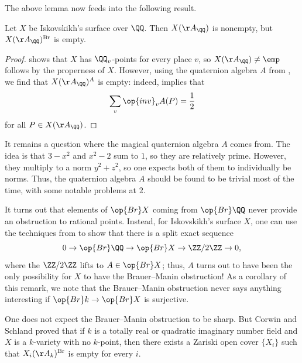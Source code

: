 \documentclass[../notes.tex]{subfiles}
\begin{document}
The above lemma now feeds into the following result.
\begin{theorem}
	Let $X$ be Iskovskikh's surface over $\QQ$. Then $X(\AA_\QQ)$ is nonempty, but $X(\AA_\QQ)^{\mathrm{Br}}$ is empty.
\end{theorem}
\begin{proof}
	 shows that $X$ has $\QQ_v$-points for every place $v$, so $X(\AA_\QQ)\ne\emp$ follows by the properness of $X$. However, using the quaternion algebra $A$ from , we find that $X(\AA_\QQ)^A$ is empty: indeed,  implies that
	\[\sum_v\op{inv}_vA(P)=\frac12\]
	for all $P\in X(\AA_\QQ)$.
\end{proof}
\begin{remark}
	It remains a question where the magical quaternion algebra $A$ comes from. The idea is that $3-x^2$ and $x^2-2$ sum to $1$, so they are relatively prime. However, they multiply to a norm $y^2+z^2$, so one expects both of them to individually be norms. Thus, the quaternion algebra $A$ should be found to be trivial most of the time, with some notable problems at $2$.
\end{remark}
\begin{remark}
	It turns out that elements of $\op{Br}X$ coming from $\op{Br}\QQ$ never provide an obstruction to rational points. Instead, for Iskovskikh's surface $X$, one can use the techniques from  to show that there is a split exact sequence
	\[0\to\op{Br}\QQ\to\op{Br}X\to\ZZ/2\ZZ\to0,\]
	where the $\ZZ/2\ZZ$ lifts to $A\in\op{Br}X$; thus, $A$ turns out to have been the only possibility for $X$ to have the Brauer--Manin obstruction! As a corollary of this remark, we note that the Brauer--Manin obstruction never says anything interesting if $\op{Br}k\to\op{Br}X$ is surjective.
\end{remark}
\begin{remark}
	One does not expect the Brauer--Manin obstruction to be sharp. But Corwin and Schland proved that if $k$ is a totally real or quadratic imaginary number field and $X$ is a $k$-variety with no $k$-point, then there exists a Zariski open cover $\{X_i\}$ such that $X_i(\AA_k)^{\mathrm{Br}}$ is empty for every $i$.
\end{remark}
\end{document}
